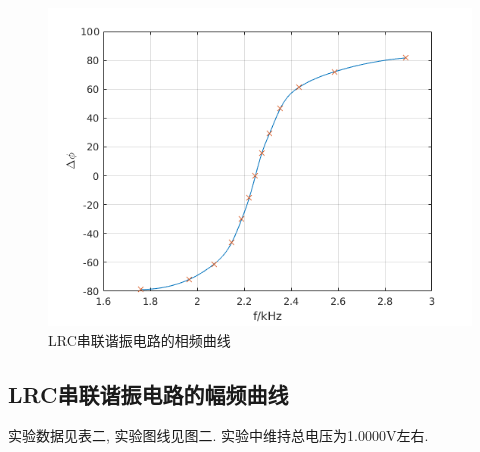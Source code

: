 \documentclass[a4paper,12pt,notitlepage]{article}
\begin{document}
\begin{figure}[H]
\centering
	\includegraphics[scale=0.7]{exp14_1.png}
	\caption{LRC串联谐振电路的相频曲线}
\end{figure}

\subsection{LRC串联谐振电路的幅频曲线}

	实验数据见表二, 实验图线见图二. 实验中维持总电压为1.0000V左右. \\
\end{document}
